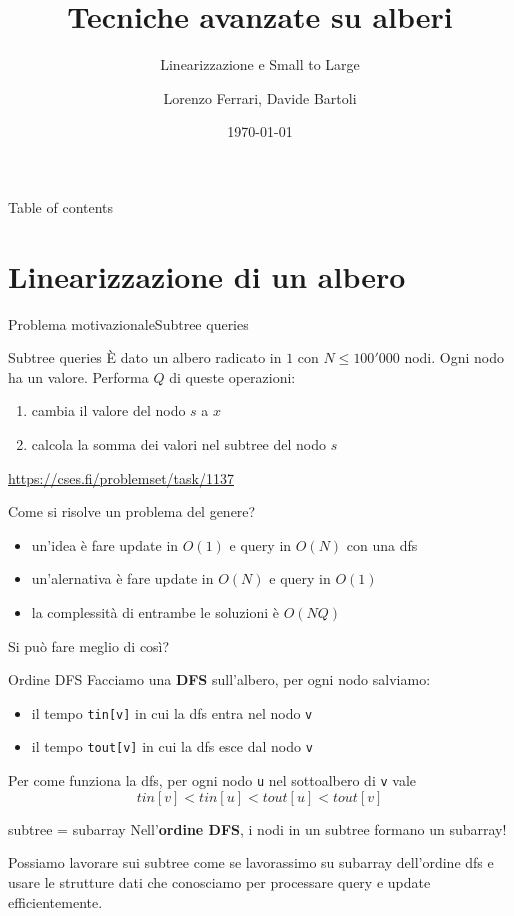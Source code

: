 \documentclass[compress]{beamer}
\title{Tecniche avanzate su alberi}
\subtitle{Linearizzazione e Small to Large}
\author{Lorenzo Ferrari, Davide Bartoli}
\date{\today}
\begin{document}
\begin{frame}
    \maketitle
\end{frame}

\begin{frame}{Table of contents}
  \tableofcontents
\end{frame}

\section{Linearizzazione di un albero}
\begin{frame}{Problema motivazionale}{Subtree queries}
    \begin{exampleblock}{Subtree queries}
        \`E dato un albero radicato in $1$ con $N \leq 100'000$ nodi. Ogni nodo ha un valore. Performa $Q$ di queste operazioni:
        \begin{enumerate}
            \item cambia il valore del nodo $s$ a $x$
            \item calcola la somma dei valori nel subtree del nodo $s$
        \end{enumerate}
    \small{\underline{\url{https://cses.fi/problemset/task/1137}}}
    \end{exampleblock}
    Come si risolve un problema del genere?
    \begin{itemize}
        \item un'idea \`e fare update in $O(1)$ e query in $O(N)$ con una dfs
        \pause
        \item un'alernativa \`e fare update in $O(N)$ e query in $O(1)$
        \pause
        \item la complessit\`a di entrambe le soluzioni \`e $O(N Q)$
    \end{itemize}
        \pause
    Si pu\`o fare meglio di cos\`i?
\end{frame}

\begin{frame}{Ordine DFS}
    Facciamo una \textbf{DFS} sull'albero, per ogni nodo salviamo:
    \begin{itemize}
        \item il tempo \texttt{tin[v]} in cui la dfs entra nel nodo \texttt{v}
        \item il tempo \texttt{tout[v]} in cui la dfs esce dal nodo \texttt{v}
    \end{itemize}
    \pause
    Per come funziona la dfs, per ogni nodo \texttt{u} nel sottoalbero di \texttt{v} vale
    $$tin[v] < tin[u] < tout[u] < tout[v]$$
    \begin{block}{subtree = subarray}
        Nell'\textbf{ordine DFS}, i nodi in un subtree formano un subarray!
    \end{block}
    \pause
    Possiamo lavorare sui subtree come se lavorassimo su subarray dell'ordine dfs e usare le strutture dati che conosciamo per processare query e update efficientemente.
\end{frame}
\end{document}
